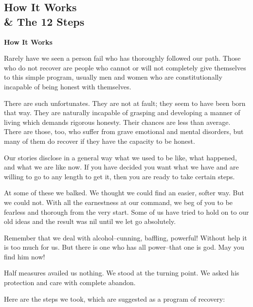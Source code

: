\documentclass{beamer}
\begin{document}
   \subsection{How It Works\\\& The 12 Steps}
\begin{frame}%
\textcolor{example}{\textbf{How It Works}}
\bigskip
\bigskip

Rarely have we seen a person fail who has thoroughly followed our path. Those who do not recover are people who cannot or will  not  completely  give  themselves  to  this  simple  program,  usually  men  and  women  who  are  constitutionally  incapable  of  being honest with themselves. 
\bigskip

There  are  such  unfortunates.  They  are  not  at  fault;  they  seem  to  have  been  born  that  way.  They  are  naturally  incapable  of  grasping  and  developing  a  manner  of  living  which  demands  rigorous  honesty.  Their  chances  are  less  than  average.  There  are  those,  too,  who  suffer  from  grave  emotional  and  mental  disorders,  but  many  of  them  do  recover  if  they  have  the    capacity to be honest. 
\bigskip
\bigskip

Our  stories  disclose  in  a  general  way  what  we  used  to  be  like,  what happened, and what we are like now. If you have decided you  want  what  we  have  and  are  willing  to  go  to  any  length  to  get it, then you are ready to take certain steps. 
\medskip

At  some  of  these  we  balked.  We  thought  we  could  find  an  easier, softer way. But we could not. With all the earnestness at our command, we beg of you to be fearless and thorough from the very start. Some of us have tried to hold on to our old ideas and the result was nil until we let go absolutely. 
\medskip

Remember   that   we   deal   with   alcohol--cunning,   baffling,   powerful! Without help it is too much for us. But there is one who has all power--that one is god. May you find him now! 
\medskip

Half  measures  availed  us  nothing.  We  stood  at  the  turning  point.   We   asked   his   protection   and   care   with   complete      abandon. 
\medskip

Here are the steps we took, which are suggested as a program of recovery:  
\bigskip


\end{frame}
\end{document}
